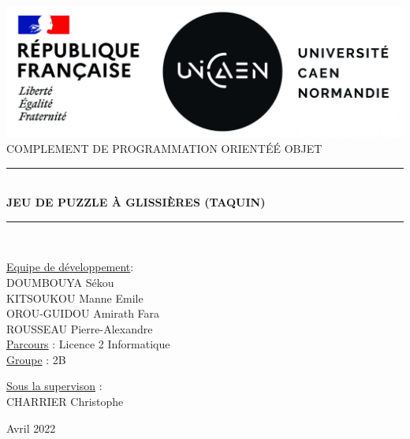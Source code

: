 \documentclass[12pt]{article}
\newcommand{\HRule}{\rule{\linewidth}{0.5mm}}
\begin{document}
\begin{titlepage}
	\begin{center}
		\includegraphics[scale=0.2]{images/logos-Marianne-UNICAEN-scaled.jpg}\\[1.5cm]
		
		\textsc{\Large COMPLEMENT DE PROGRAMMATION ORIENTÉÉ OBJET}\\[1.5cm]
		
		\HRule \\[0.4cm]
		{
			\LARGE \bfseries JEU DE PUZZLE À GLISSIÈRES (TAQUIN) \\[0.2cm]
		}
		\HRule \\[0.5cm]
	\end{center}
		
		\begin{minipage}[c]{0.5\linewidth}
			\begin{flushleft}
				\underline{Equipe de développement}: \\[0.5cm]
				DOUMBOUYA Sékou\\[0.2cm]
				KITSOUKOU Manne Emile\\[0.2cm]
				OROU-GUIDOU Amirath Fara\\[0.2cm]
				ROUSSEAU Pierre-Alexandre\\[0.2cm]
				\underline{Parcours} : Licence 2 Informatique\\[0.2cm]
				\underline{Groupe} : 2B\\
			\end{flushleft}
		\end{minipage}
		
		\begin{minipage}[c]{\linewidth}
			\begin{flushright}
				\underline{Sous la supervison} :\\[0.3cm]
			    CHARRIER Christophe
			\end{flushright}
		\end{minipage}
		
		\center Avril 2022
\end{titlepage}
\newpage
\end{document}
